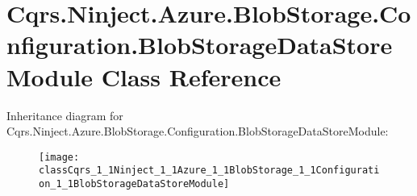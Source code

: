 \hypertarget{classCqrs_1_1Ninject_1_1Azure_1_1BlobStorage_1_1Configuration_1_1BlobStorageDataStoreModule}{}\section{Cqrs.\+Ninject.\+Azure.\+Blob\+Storage.\+Configuration.\+Blob\+Storage\+Data\+Store\+Module Class Reference}
\label{classCqrs_1_1Ninject_1_1Azure_1_1BlobStorage_1_1Configuration_1_1BlobStorageDataStoreModule}
Inheritance diagram for Cqrs.\+Ninject.\+Azure.\+Blob\+Storage.\+Configuration.\+Blob\+Storage\+Data\+Store\+Module\+:\begin{figure}[H]
\begin{center}
\leavevmode
\texttt{[image: classCqrs\_1\_1Ninject\_1\_1Azure\_1\_1BlobStorage\_1\_1Configuration\_1\_1BlobStorageDataStoreModule]}
\end{center}
\end{figure}
